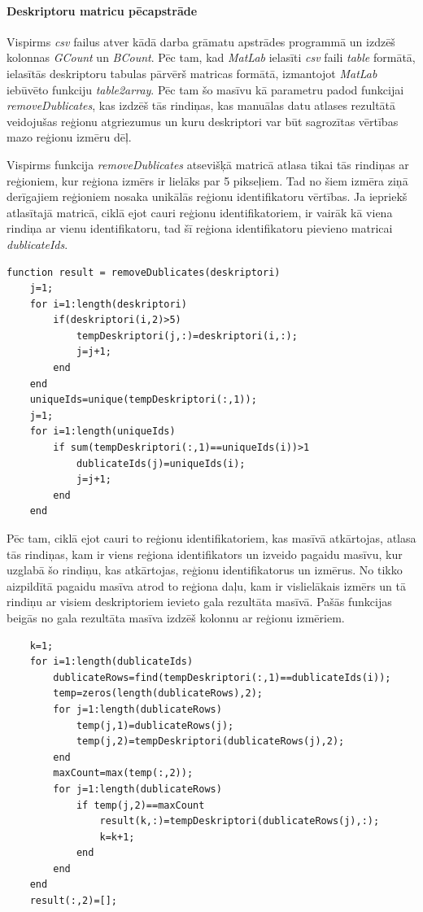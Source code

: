 \documentclass[12pt,paper=a4]{report}
\begin{document}
\paragraph{Deskriptoru matricu pēcapstrāde}Vispirms \textit{csv} failus atver kādā darba grāmatu apstrādes programmā un izdzēš kolonnas \textit{GCount} un \textit{BCount}. Pēc tam, kad \textit{MatLab} ielasīti \textit{csv} faili \textit{table} formātā, ielasītās deskriptoru tabulas pārvērš matricas formātā, izmantojot \textit{MatLab} iebūvēto funkciju \textit{table2array}. Pēc tam šo masīvu kā parametru padod funkcijai \textit{removeDublicates}, kas izdzēš tās rindiņas, kas manuālas datu atlases rezultātā veidojušas reģionu atgriezumus un kuru deskriptori var būt sagrozītas vērtības mazo reģionu izmēru dēļ.\par 
Vispirms funkcija \textit{removeDublicates} atsevišķā matricā atlasa tikai tās rindiņas ar reģioniem, kur reģiona izmērs ir lielāks par 5 pikseļiem. Tad no šiem izmēra ziņā derīgajiem reģioniem nosaka unikālās reģionu identifikatoru vērtības. Ja iepriekš atlasītajā matricā, ciklā ejot cauri reģionu identifikatoriem, ir vairāk kā viena rindiņa ar vienu identifikatoru, tad šī reģiona identifikatoru pievieno matricai \textit{dublicateIds}.
\begin{lstlisting}
function result = removeDublicates(deskriptori)
	j=1;
	for i=1:length(deskriptori)
   		if(deskriptori(i,2)>5)
       		tempDeskriptori(j,:)=deskriptori(i,:);
       		j=j+1;
   		end
	end
	uniqueIds=unique(tempDeskriptori(:,1));
	j=1;
	for i=1:length(uniqueIds)
    	if sum(tempDeskriptori(:,1)==uniqueIds(i))>1
        	dublicateIds(j)=uniqueIds(i);
        	j=j+1;
    	end
	end
\end{lstlisting}
Pēc tam, ciklā ejot cauri to reģionu identifikatoriem, kas masīvā atkārtojas, atlasa tās rindiņas, kam ir viens reģiona identifikators un izveido pagaidu masīvu, kur uzglabā šo rindiņu, kas atkārtojas, reģionu identifikatorus un izmērus. No tikko aizpildītā pagaidu masīva atrod to reģiona daļu, kam ir vislielākais izmērs un tā rindiņu ar visiem deskriptoriem ievieto gala rezultāta masīvā. Pašās funkcijas beigās no gala rezultāta masīva izdzēš kolonnu ar reģionu izmēriem.
\begin{lstlisting}
	k=1;
	for i=1:length(dublicateIds)
    	dublicateRows=find(tempDeskriptori(:,1)==dublicateIds(i));
    	temp=zeros(length(dublicateRows),2);
    	for j=1:length(dublicateRows)
        	temp(j,1)=dublicateRows(j);
        	temp(j,2)=tempDeskriptori(dublicateRows(j),2);
    	end
    	maxCount=max(temp(:,2));
    	for j=1:length(dublicateRows)
        	if temp(j,2)==maxCount
            	result(k,:)=tempDeskriptori(dublicateRows(j),:);
            	k=k+1;
        	end
    	end
	end
	result(:,2)=[];
\end{lstlisting}\par
\end{document}
